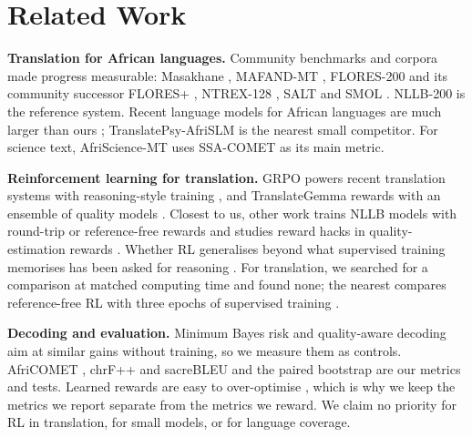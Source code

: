 \section{Related Work}\label{sec:related}
\textbf{Translation for African languages.} Community benchmarks and corpora made progress measurable: Masakhane \citep{nekoto2020participatory}, MAFAND-MT \citep{adelani2022mafand}, FLORES-200 and its community successor FLORES+ \citep{goyal2022flores101,oldi2025floresplus}, NTREX-128 \citep{federmann2022ntrex}, SALT \citep{akera2022salt} and SMOL \citep{caswell2025smol}. NLLB-200 \citep{nllb2022nllb} is the reference system. Recent language models for African languages are much larger than ours \citep{yu2026afriquellm,akera2025sunflower}; TranslatePsy-AfriSLM \citep{gritta2026translatepsy} is the nearest small competitor. For science text, AfriScience-MT \citep{abdulmumin2026afriscience} uses SSA-COMET \citep{li2025ssacomet} as its main metric.

\textbf{Reinforcement learning for translation.} GRPO \citep{shao2024deepseekmath,yu2025dapo} powers recent translation systems with reasoning-style training \citep{feng2025mtr1zero,wang2025deeptrans,cheng2025seedx,zheng2025hunyuanmt}, and TranslateGemma rewards with an ensemble of quality models \citep{finkelstein2026translategemma}. Closest to us, other work trains NLLB models with round-trip or reference-free rewards \citep{attia2026roundtrip,garciaestrada2026reffree} and studies reward hacks in quality-estimation rewards \citep{liu2026walar,han2026milmmtrl}. Whether RL generalises beyond what supervised training memorises has been asked for reasoning \citep{chu2025sft,yue2025doesrl}. For translation, we searched for a comparison at matched computing time and found none; the nearest compares reference-free RL with three epochs of supervised training \citep{garciaestrada2026reffree}.

\textbf{Decoding and evaluation.} Minimum Bayes risk and quality-aware decoding \citep{freitag2022mbr,fernandes2022qualityaware} aim at similar gains without training, so we measure them as controls. AfriCOMET \citep{wang2024africomet}, chrF++ and sacreBLEU \citep{popovic2017chrfpp,post2018call} and the paired bootstrap \citep{koehn2004significance} are our metrics and tests. Learned rewards are easy to over-optimise \citep{gao2023scaling,coste2024ensembles}, which is why we keep the metrics we report separate from the metrics we reward. We claim no priority for RL in translation, for small models, or for language coverage.
